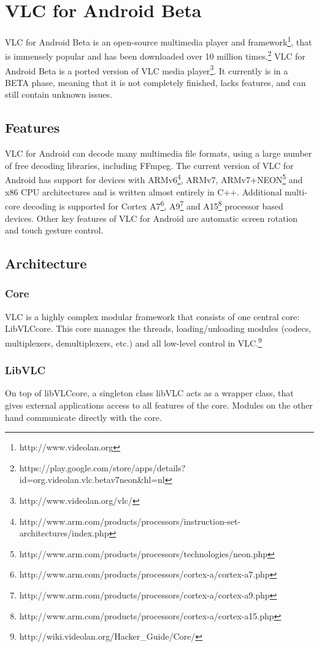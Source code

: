 \section{VLC for Android Beta}
VLC for Android Beta is an open-source multimedia player and framework\footnote{http://www.videolan.org}, that is immensely popular and has been downloaded over 10 million times.\footnote{https://play.google.com/store/apps/details?id=org.videolan.vlc.betav7neon\&hl=nl} VLC for Android Beta is a ported version of VLC media player\footnote{http://www.videolan.org/vlc/}. It currently is in a BETA phase, meaning that it is not completely finished, lacks features, and can still contain unknown issues.
\subsection{Features}
VLC for Android can decode many multimedia file formats, using a large number of free decoding libraries, including FFmpeg. The current version of VLC for Android has support for devices with ARMv6\footnote{http://www.arm.com/products/processors/instruction-set-architectures/index.php}, ARMv7, ARMv7+NEON\footnote{http://www.arm.com/products/processors/technologies/neon.php} and x86 CPU architectures and is written almost entirely in C++. Additional multi-core decoding is supported for Cortex A7\footnote{http://www.arm.com/products/processors/cortex-a/cortex-a7.php}, A9\footnote{http://www.arm.com/products/processors/cortex-a/cortex-a9.php} and A15\footnote{http://www.arm.com/products/processors/cortex-a/cortex-a15.php} processor based devices. Other key features of VLC for Android are automatic screen rotation and touch gesture control.
\subsection{Architecture}
\subsubsection{Core}
VLC is a highly complex modular framework that consists of one central core: LibVLCcore. This core manages the threads, loading/unloading modules (codecs, multiplexers, demultiplexers, etc.) and all low-level control in VLC.\footnote{http://wiki.videolan.org/Hacker\_Guide/Core/}
\subsubsection{LibVLC}
On top of libVLCcore, a singleton class libVLC acts as a wrapper class, that gives external applications access to all features of the core. Modules on the other hand communicate directly with the core.
